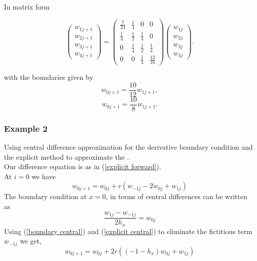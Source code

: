 In matrix form

\[
\left(\begin{array}{c}
w_{1j+1}\\
w_{2j+1}\\
w_{3j+1}\\
w_{4j+1}
\end{array}\right)
=\left(\begin{array}{cccc}
\frac{7}{24}&\frac{1}{4}&0&0\\
\frac{1}{4}&\frac{1}{2}&\frac{1}{4}&0\\
0&\frac{1}{4}&\frac{1}{2}&\frac{1}{4}\\
0&0&\frac{1}{4}&\frac{13}{16}
\end{array}\right)
\left(\begin{array}{c}
w_{1j}\\
w_{2j}\\
w_{3j}\\
w_{4j}
\end{array}\right).
\]

with the boundaries given by
\[w_{0j+1}=\frac{10}{12}w_{1j+1},\]
\[w_{0j+1}=\frac{10}{8}w_{1j+1}.\]


\subsubsection{Example 2}
Using central difference approximation for the derivative boundary condition
and the explicit method to approximate the .\\
Our difference equation is as in (\ref{explicit forward}).\\
At $i=0$ we have
\begin{equation}
\label{explicit central}
w_{0j+1}=w_{0j} +r(w_{-1j}-2w_{0j}+w_{1j})
\end{equation}
The boundary condition at $x=0$, in terms of central differences can be written as
\begin{equation}
\label{boundary central}
\frac{w_{1j}-w_{-1j}}{2h_x}=w_{0j} 
\end{equation}
Using (\ref{boundary central}) and (\ref{explicit central}) to eliminate the fictitious term $w_{-1j}$ we get,
\[
w_{0j+1}=w_{0j} +2r((-1-h_x)w_{0j}+w_{1j})
\]
